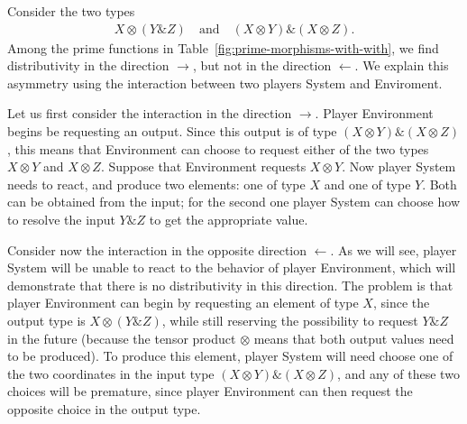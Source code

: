 \begin{example}\label{ex:amp-otimes-distr}
    Consider the two types 
    \begin{align*}
        X \otimes (Y \& Z) 
        \quad \text{and} \quad
        (X \otimes Y) \& (X \otimes Z).
    \end{align*}
    Among the prime functions in Table~\ref{fig:prime-morphisms-with-with}, we find distributivity in the direction $\rightarrow$, but not in the direction $\leftarrow$. We explain this asymmetry using the interaction between two players System and Enviroment.

    Let us first consider the interaction in the  direction $\rightarrow$. Player Environment begins be requesting an output. Since this output is of type $(X \otimes Y) \& (X \otimes Z)$, this means that Environment can choose to request either of the two types  $X \otimes Y$ and $X \otimes Z$. Suppose that Environment requests $X \otimes Y$. Now player System needs to react, and produce two elements: one of type $X$ and one of type $Y$. Both can be obtained from the input; for the second one player System can choose how to resolve the input $Y \& Z$ to get the appropriate value. 

    Consider now the interaction in the opposite direction $\leftarrow$. As we will see, player System will be unable to react to the behavior of player Environment, which will demonstrate that there is no distributivity in this direction. The problem is that player Environment can begin by requesting an element of type $X$, since the output type is $X \otimes (Y \& Z)$, while still reserving the possibility to request $Y \& Z$ in the future (because the tensor product $\otimes$ means that both output values need to be produced). To produce this element, player System will need  choose one of the two coordinates in the input type $(X \otimes Y) \& (X \otimes Z)$, and any of these two  choices will be premature, since player Environment can then request the opposite choice in the output type.  \exampleend
\end{example}


